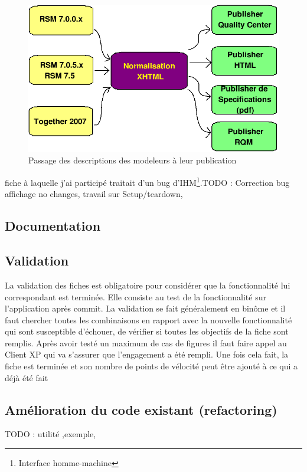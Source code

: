 \begin{figure}[!h]
\centering
\includegraphics[scale=0.5]{Illustrations/bigDescSchema.png}
\caption{Passage des descriptions des modeleurs à leur publication}
\label{figure:descXHTMLPublisher}
\end{figure}





fiche à laquelle j'ai participé traitait d'un bug d'IHM\footnote{Interface homme-machine}.TODO : Correction bug affichage no changes, travail sur Setup/teardown, 
\subsection{Documentation}

\subsection{Validation}
La validation des fiches est obligatoire pour considérer que la fonctionnalité lui correspondant est terminée. Elle consiste au test de la fonctionnalité sur l'application après commit. La validation se fait généralement en binôme et il faut chercher toutes les combinaisons en rapport avec la nouvelle fonctionnalité qui sont susceptible d'échouer, de vérifier si toutes les objectifs de la fiche sont remplis. Après avoir testé un maximum de cas de figures il faut faire appel au Client XP qui va s'assurer que l'engagement a été rempli. Une fois cela fait, la fiche est terminée et son nombre de points de vélocité peut être ajouté à ce qui a déjà été fait
\subsection{Amélioration du code existant (refactoring)}
TODO : utilité ,exemple, 

